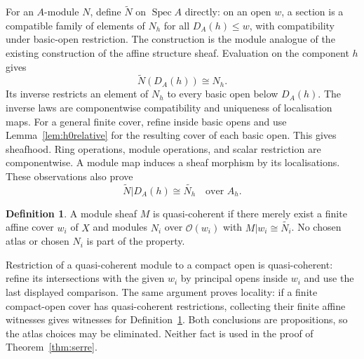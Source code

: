 \documentclass[11pt]{amsart}
\theoremstyle{definition}\newtheorem{definition}[theorem]{Definition}
\theoremstyle{remark}\newtheorem{remark}[theorem]{Remark}
\newcommand{\OO}{\mathcal O}
\newcommand{\Spec}{\operatorname{Spec}}
\begin{document}
For an $A$-module $N$, define $\widetilde N$ on $\Spec A$ directly:
on an open $w$, a section is a compatible family of elements of $N_h$
for all $D_A(h)\le w$, with compatibility under basic-open restriction.
The construction is the module analogue of the existing construction
of the affine structure sheaf. Evaluation on the component $h$ gives
\begin{equation}\label{eq:module-basic}
 \widetilde N(D_A(h))\cong N_h.
\end{equation}
Its inverse restricts an element of $N_h$ to every basic open below
$D_A(h)$. The inverse laws are componentwise compatibility and
uniqueness of localisation maps. For a general finite cover, refine
inside basic opens and use Lemma~\ref{lem:h0relative} for the resulting
cover of each basic open. This gives sheafhood. Ring operations, module operations,
and scalar restriction are componentwise. A module map induces a
sheaf morphism by its localisations. These observations also prove
\[
 \widetilde N|D_A(h)\cong\widetilde{N_h}
 \quad\text{over }A_h.
\]

\begin{definition}\label{def:qc}
A module sheaf $M$ is quasi-coherent if there merely exist a finite
affine cover $w_i$ of $X$ and modules $N_i$ over $\OO(w_i)$ with
$M|w_i\cong\widetilde{N_i}$. No chosen atlas or chosen $N_i$ is
part of the property.
\end{definition}

Restriction of a quasi-coherent module to a compact open is
quasi-coherent: refine its intersections with the given $w_i$ by
principal opens inside $w_i$ and use the last displayed comparison.
The same argument proves locality: if a finite compact-open cover has
quasi-coherent restrictions, collecting their finite affine witnesses
gives witnesses for Definition~\ref{def:qc}. Both conclusions are
propositions, so the atlas choices may be eliminated. Neither fact is
used in the proof of Theorem~\ref{thm:serre}.
\end{document}
